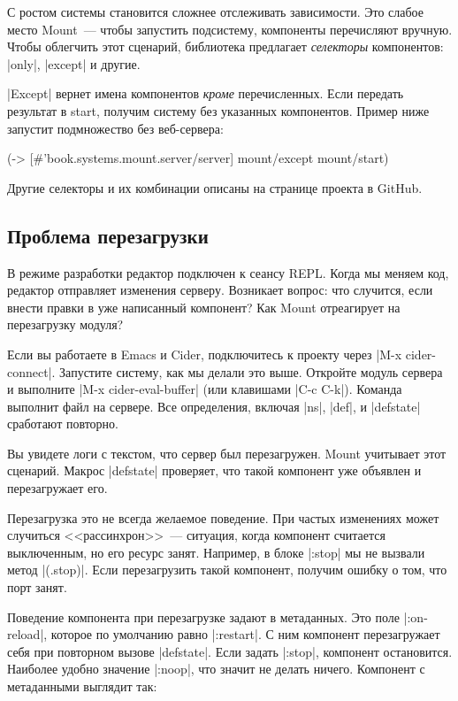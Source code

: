 С ростом системы становится сложнее отслеживать зависимости. Это слабое место
Mount~--- чтобы запустить подсистему, компоненты перечисляют
вручную. Чтобы облегчить этот сценарий, библиотека предлагает \emph{селекторы}
компонентов: \spverb|only|, \spverb|except| и другие.

\spverb|Except| вернет имена компонентов \emph{кроме} перечисленных. Если
передать результат в start, получим систему без указанных компонентов. Пример
ниже запустит подмножество без веб-сервера:

\begin{english}
  \begin{clojure}
(-> [#'book.systems.mount.server/server]
    mount/except
    mount/start)
  \end{clojure}
\end{english}

Другие селекторы и их комбинации описаны на странице проекта в GitHub.

\subsection{Проблема перезагрузки}

В режиме разработки редактор подключен к сеансу REPL. Когда мы меняем код,
редактор отправляет изменения серверу. Возникает вопрос: что случится, если
внести правки в уже написанный компонент? Как Mount отреагирует на
перезагрузку модуля?

Если вы работаете в Emacs и Cider, подключитесь к проекту через
\spverb|M-x cider-connect|. Запустите систему, как мы делали это выше. Откройте модуль
сервера и выполните \spverb|M-x cider-eval-buffer| (или клавишами
\spverb|C-c C-k|). Команда выполнит файл на сервере. Все определения, включая \spverb|ns|,
\spverb|def|, и \spverb|defstate| сработают повторно.

Вы увидете логи с текстом, что сервер был перезагружен. Mount учитывает
этот сценарий. Макрос \spverb|defstate| проверяет, что такой компонент уже
объявлен и перезагружает его.

Перезагрузка это не всегда желаемое поведение. При частых изменениях может
случиться <<рассинхрон>>~--- ситуация, когда компонент считается выключенным, но
его ресурс занят. Например, в блоке \spverb|:stop| мы не вызвали метод
\spverb|(.stop)|. Если перезагрузить такой компонент, получим ошибку о том, что
порт занят.

Поведение компонента при перезагрузке задают в метаданных. Это поле
\spverb|:on-reload|, которое по умолчанию равно \spverb|:restart|. С ним
компонент перезагружает себя при повторном вызове \spverb|defstate|. Если задать
\spverb|:stop|, компонент остановится. Наиболее удобно значение \spverb|:noop|,
что значит не делать ничего. Компонент с метаданными выглядит так:

